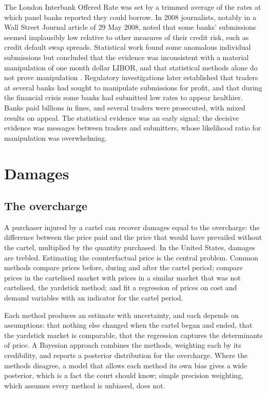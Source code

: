The London Interbank Offered Rate was set by a trimmed average of the rates at which panel banks reported they could borrow. In 2008 journalists, notably in a Wall Street Journal article of 29 May 2008, noted that some banks' submissions seemed implausibly low relative to other measures of their credit risk, such as credit default swap spreads. Statistical work found some anomalous individual submissions but concluded that the evidence was inconsistent with a material manipulation of one month dollar LIBOR, and that statistical methods alone do not prove manipulation \citep{abrantes2012}. Regulatory investigations later established that traders at several banks had sought to manipulate submissions for profit, and that during the financial crisis some banks had submitted low rates to appear healthier. Banks paid billions in fines, and several traders were prosecuted, with mixed results on appeal. The statistical evidence was an early signal; the decisive evidence was messages between traders and submitters, whose likelihood ratio for manipulation was overwhelming.

\section{Damages}

\subsection{The overcharge}

A purchaser injured by a cartel can recover damages equal to the overcharge: the difference between the price paid and the price that would have prevailed without the cartel, multiplied by the quantity purchased. In the United States, damages are trebled. Estimating the counterfactual price is the central problem. Common methods compare prices before, during and after the cartel period; compare prices in the cartelised market with prices in a similar market that was not cartelised, the yardstick method; and fit a regression of prices on cost and demand variables with an indicator for the cartel period.

Each method produces an estimate with uncertainty, and each depends on assumptions: that nothing else changed when the cartel began and ended, that the yardstick market is comparable, that the regression captures the determinants of price. A Bayesian approach combines the methods, weighting each by its credibility, and reports a posterior distribution for the overcharge. Where the methods disagree, a model that allows each method its own bias gives a wide posterior, which is a fact the court should know; simple precision weighting, which assumes every method is unbiased, does not.

